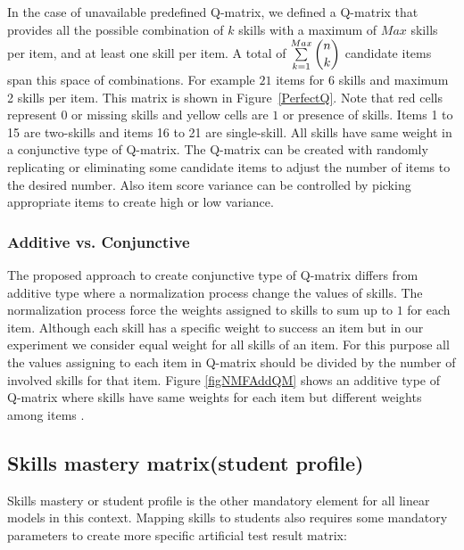 In the case of unavailable predefined Q-matrix, we defined a Q-matrix that provides all the possible combination of $k$ skills with a maximum of $Max$ skills per item, and at least one skill per item. A total of $\sum\limits_{k=1}^{Max} \dbinom{n}{k}$ candidate items span this space of combinations. For example $21$ items for 6 skills and maximum 2 skills per item. This matrix is shown in Figure~\ref{PerfectQ}. Note that red cells represent $0$ or missing skills and yellow cells are $1$ or presence of skills. Items 1 to 15 are two-skills and items 16 to 21 are single-skill. All skills have same weight in a conjunctive type of Q-matrix. The Q-matrix can be created with randomly replicating or eliminating some candidate items to adjust the number of items to the desired number. Also item score variance can be controlled by picking appropriate items to create high or low variance.

\subsubsection{Additive vs. Conjunctive}
The proposed approach to create conjunctive type of Q-matrix differs from additive type where a normalization process change the values of skills. The normalization process force the weights assigned to skills to sum up to $1$ for each item. Although each skill has a specific weight to success an item but in our experiment we consider equal weight for all skills of an item. For this purpose all the values assigning to each item in Q-matrix should be divided by the number of involved skills for that item. Figure \ref{figNMFAddQM} shows an additive type of Q-matrix where skills have same weights for each item but different weights among items . 



\subsection{Skills mastery matrix(student profile)}
Skills mastery or student profile is the other mandatory element for all linear models in this context. Mapping skills to students also requires some mandatory parameters to create more specific artificial test result matrix:
